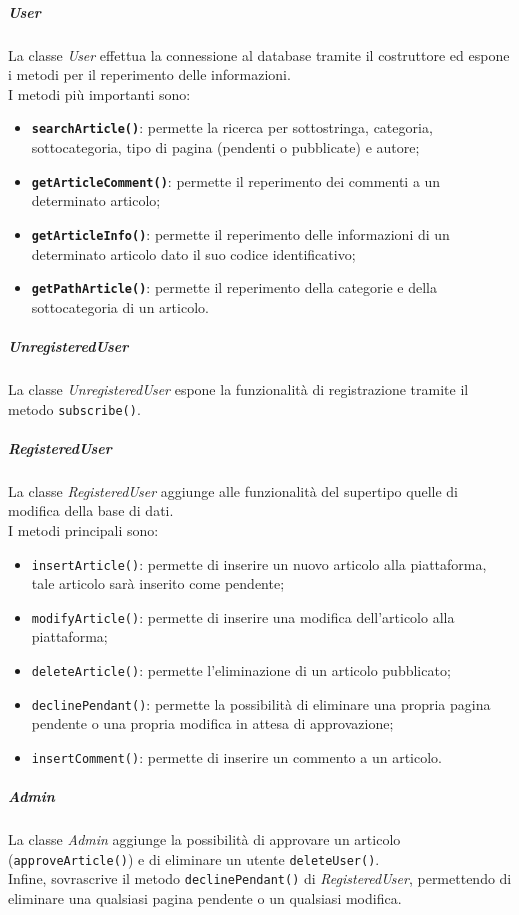 \subparagraph{User} 
La classe \textit{User} effettua la connessione al database tramite il costruttore ed espone i metodi per il reperimento delle informazioni.\\
I metodi più importanti sono:
\begin{itemize}
	\item \textbf{\texttt{searchArticle()}}: permette la ricerca per sottostringa, categoria, sottocategoria, tipo di pagina (pendenti o pubblicate) e autore;
	\item \textbf{\texttt{getArticleComment()}}: permette il reperimento dei commenti a un determinato articolo;
	\item \textbf{\texttt{getArticleInfo()}}: permette il reperimento delle informazioni di un determinato articolo dato il suo codice identificativo;
	\item \textbf{\texttt{getPathArticle()}}: permette il reperimento della categorie e della sottocategoria di un articolo.
\end{itemize}

\subparagraph{UnregisteredUser} 
La classe \textit{UnregisteredUser} espone la funzionalità di registrazione tramite il metodo \texttt{subscribe()}.

\subparagraph{RegisteredUser} 
La classe \textit{RegisteredUser} aggiunge alle funzionalità del supertipo quelle di modifica della base di dati.\\
I metodi principali sono:
\begin{itemize}
	\item \texttt{insertArticle()}: permette di inserire un nuovo articolo alla piattaforma, tale articolo sarà inserito come pendente;
	\item \texttt{modifyArticle()}: permette di inserire una modifica dell'articolo alla piattaforma;
	\item \texttt{deleteArticle()}: permette l'eliminazione di un articolo pubblicato;
	\item \texttt{declinePendant()}: permette la possibilità di eliminare una propria pagina pendente o una propria modifica in attesa di approvazione;
	\item \texttt{insertComment()}: permette di inserire un commento a un articolo.
\end{itemize}

\subparagraph{Admin}
La classe \textit{Admin} aggiunge la possibilità di approvare un articolo (\texttt{approveArticle()}) e di eliminare un utente \texttt{deleteUser()}.\\
Infine, sovrascrive il metodo \texttt{declinePendant()} di \textit{RegisteredUser}, permettendo di eliminare una qualsiasi pagina pendente o un qualsiasi modifica.


